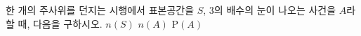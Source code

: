 한 개의 주사위를 던지는 시행에서 표본공간을 $S$, 3의 배수의 눈이 나오는 사건을 $A$라 할 때, 다음을 구하시오.
 $n(S)$
 $n(A)$
 $\mathrm{P}(A)$

